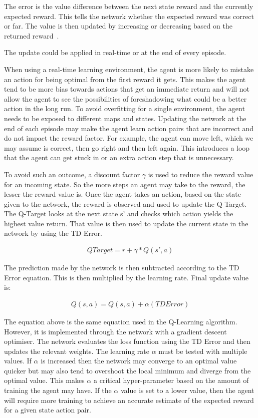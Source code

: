 The error is the value difference between the next state reward and the
currently expected reward. This tells the network whether the expected reward
was correct or far. The value is then updated by increasing or decreasing based
on the returned reward~\cite{pandey2010reinforcement}.

The update could be applied in real-time or at the end of every episode.

When using a real-time learning environment, the agent is more likely to mistake
an action for being optimal from the first reward it gets. This makes the agent
tend to be more bias towards actions that get an immediate return and will not
allow the agent to see the possibilities of foreshadowing what could be a better
action in the long run. To avoid overfitting for a single environment, the agent
needs to be exposed to different maps and states. Updating the network at the
end of each episode may make the agent learn action pairs that are incorrect and
do not impact the reward factor. For example, the agent can move left, which we
may assume is correct, then go right and then left again. This introduces a loop
that the agent can get stuck in or an extra action step that is unnecessary.

To avoid such an outcome, a discount factor $\gamma$ is used to reduce the
reward value for an incoming state. So the more steps an agent may take to the
reward, the lesser the reward value is. Once the agent takes an action, based on
the state given to the network, the reward is observed and used to update the
Q-Target. The Q-Target looks at the next state s' and checks which action yields
the highest value return. That value is then used to update the current state in
the network by using the TD Error.

\begin{align}
    QTarget = r + \gamma*Q(s',a)
\end{align}

The prediction made by the network is then subtracted according to the TD Error
equation. This is then multiplied by the learning rate. Final update value
is:

\begin{align}
    Q(s,a) = Q(s,a) + \alpha (TDError)
\end{align}

The equation above is the same equation used in the Q-Learning algorithm.
However, it is implemented through the network with a gradient descent
optimiser. The network evaluates the loss function using the TD Error and then
updates the relevant weights. The learning rate $\alpha$ must be tested with
multiple values. If $\alpha$ is increased then the network may converge to an
optimal value quicker but may also tend to overshoot the local minimum and
diverge from the optimal value. This makes $\alpha$ a critical hyper-parameter
based on the amount of training the agent may have. If the $\alpha$ value is set
to a lower value, then the agent will require more training to achieve an
accurate estimate of the expected reward for a given state action pair.

